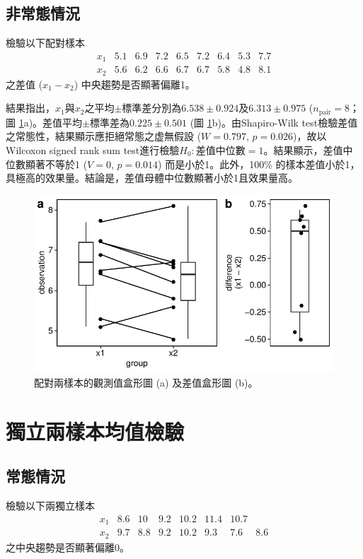 \documentclass[12pt, a4paper, onecolumn]{article}
\begin{document}
\subsection{非常態情況}
檢驗以下配對樣本
\[
\begin{matrix}
x_1 & 5.1 & 6.9 & 7.2 & 6.5 & 7.2 & 6.4 & 5.3 & 7.7 \\
x_2 & 5.6 & 6.2 & 6.6 & 6.7 & 6.7 & 5.8 & 4.8 & 8.1
\end{matrix}
\]
之差值 ($x_1 - x_2$) 中央趨勢是否顯著偏離1。

結果指出，$x_1$與$x_2$之平均$\pm$標準差分別為$6.538 \pm 0.924$及$6.313 \pm 0.975$ ($n_\mathrm{pair} = 8$；圖 \ref{fig:non-normal_paired_test}a)。差值平均$\pm$標準差為$0.225\pm0.501$ (圖 \ref{fig:non-normal_paired_test}b)。由Shapiro-Wilk test檢驗差值之常態性，結果顯示應拒絕常態之虚無假設 ($W = 0.797$, $p = 0.026$)，故以Wilcoxon signed rank sum test進行檢驗$H_0: \text{差值中位數}=1$。結果顯示，差值中位數顯著不等於1 ($V = 0$, $p = 0.014$) 而是小於1。此外，100\% 的樣本差值小於1，具極高的效果量。結論是，差值母體中位數顯著小於1且效果量高。

\begin{figure}[ht!]
	\centering
	\includegraphics[]{non-normal_paired_test.pdf}
	\caption{配對兩樣本的觀測值盒形圖 (a) 及差值盒形圖 (b)。}
	\label{fig:non-normal_paired_test}
\end{figure}

\section{獨立兩樣本均值檢驗}
\subsection{常態情況}
檢驗以下兩獨立樣本
\[
\begin{matrix}
x_1 & 8.6 & 10 & 9.2 & 10.2 & 11.4 & 10.7 & \\
x_2 & 9.7 & 8.8 & 9.2 & 10.2 & 9.3 & 7.6 & 8.6
\end{matrix}
\]
之中央趨勢是否顯著偏離0。
\end{document}
